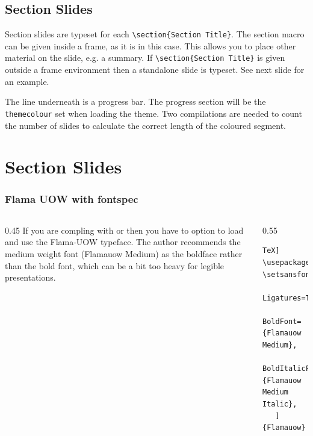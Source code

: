 \documentclass[aspectratio=169]{beamer}
\newcommand{\command}[1]{\texttt{\color{UOWdarkgreen}#1}}
\begin{document}
\begin{frame}
\section{Section Slides}
Section slides are typeset for each \command{\textbackslash{}section\{Section Title\}}. The section macro can be given inside a frame, as it is in this case. This allows you to place other material on the slide, e.g. a summary. If \command{\textbackslash{}section\{Section Title\}} is given outside a frame environment then a standalone slide is typeset. See next slide for an example. 
   
The line underneath is a progress bar. The progress section will be the \texttt{themecolour} set when loading the theme. Two compilations are needed to count the number of slides to calculate the correct length of the coloured segment.
   
\end{frame}


\section{Section Slides}


\begin{frame}[fragile]
\frametitle{Flama UOW with fontspec}
\begin{columns}[T]
\begin{column}{0.45\textwidth}
If you are compling with \XeLaTeX{} or \LuaLaTeX{} then you have to option to load and use the Flama-UOW typeface. The author recommends the medium weight font (Flamauow Medium) as the boldface rather than the bold font, which can be a bit too heavy for legible presentations. 
\end{column}
\begin{column}{0.55\textwidth}
\begin{lstlisting}[langauge=[LaTeX]TeX]
\usepackage{fontspec}
\setsansfont[%
   Ligatures=TeX,
   BoldFont={Flamauow Medium},
   BoldItalicFont={Flamauow Medium Italic},
   ]{Flamauow}
\end{lstlisting}
\end{column}
\end{columns}
\end{frame}
\end{document}
